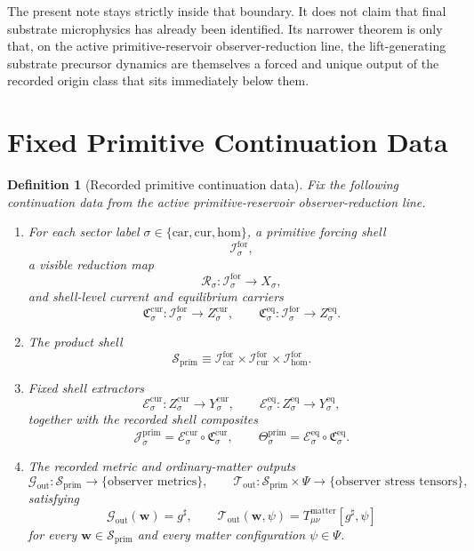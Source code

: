 \documentclass[11pt]{article}
\newcommand{\CompletedMetric}{g^{\sharp}}
\newcommand{\Car}{\mathrm{car}}
\newcommand{\Cur}{\mathrm{cur}}
\newcommand{\Hom}{\mathrm{hom}}
\newcommand{\ForSpace}[1]{\mathcal I_{#1}^{\mathrm{for}}}
\newcommand{\PrimShell}{\mathcal S_{\mathrm{prim}}}
\newcommand{\Reduction}[1]{\mathcal R_{#1}}
\newcommand{\CurrentCarrier}[1]{\mathfrak C_{#1}^{\mathrm{cur}}}
\newcommand{\EqCarrier}[1]{\mathfrak C_{#1}^{\mathrm{eq}}}
\newcommand{\CurrentExtract}[1]{\mathscr E_{#1}^{\mathrm{cur}}}
\newcommand{\EqExtract}[1]{\mathscr E_{#1}^{\mathrm{eq}}}
\newcommand{\PrimCurrent}[1]{\mathcal J_{#1}^{\mathrm{prim}}}
\newcommand{\PrimTheta}[1]{\Theta_{#1}^{\mathrm{prim}}}
\newcommand{\MetricOut}{\mathscr G_{\mathrm{out}}}
\newcommand{\MatterOut}{\mathscr T_{\mathrm{out}}}
\newtheorem{definition}{Definition}
\begin{document}
The present note stays strictly inside that boundary. It does not claim that final substrate microphysics has already been identified. Its narrower theorem is only that, on the active primitive-reservoir observer-reduction line, the lift-generating substrate precursor dynamics are themselves a forced and unique output of the recorded origin class that sits immediately below them.

\section{Fixed Primitive Continuation Data}

\begin{definition}[Recorded primitive continuation data]
\label{def:fixed}
Fix the following continuation data from the active primitive-reservoir observer-reduction line.
\begin{enumerate}
    \item For each sector label \(\sigma\in\{\Car,\Cur,\Hom\}\), a primitive forcing shell
    \[
    \ForSpace{\sigma},
    \]
    a visible reduction map
    \[
    \Reduction{\sigma}:\ForSpace{\sigma}\to X_{\sigma},
    \]
    and shell-level current and equilibrium carriers
    \[
    \CurrentCarrier{\sigma}:\ForSpace{\sigma}\to Z_{\sigma}^{\mathrm{cur}},
    \qquad
    \EqCarrier{\sigma}:\ForSpace{\sigma}\to Z_{\sigma}^{\mathrm{eq}}.
    \]
    \item The product shell
    \[
    \PrimShell
    \equiv
    \ForSpace{\Car}\times \ForSpace{\Cur}\times \ForSpace{\Hom}.
    \]
    \item Fixed shell extractors
    \[
    \CurrentExtract{\sigma}:Z_{\sigma}^{\mathrm{cur}}\to Y_{\sigma}^{\mathrm{cur}},
    \qquad
    \EqExtract{\sigma}:Z_{\sigma}^{\mathrm{eq}}\to Y_{\sigma}^{\mathrm{eq}},
    \]
    together with the recorded shell composites
    \begin{equation}
    \PrimCurrent{\sigma}
    =
    \CurrentExtract{\sigma}\circ \CurrentCarrier{\sigma},
    \qquad
    \PrimTheta{\sigma}
    =
    \EqExtract{\sigma}\circ \EqCarrier{\sigma}.
    \label{eq:primcomposites}
    \end{equation}
    \item The recorded metric and ordinary-matter outputs
    \[
    \MetricOut:\PrimShell\to\{\text{observer metrics}\},
    \qquad
    \MatterOut:\PrimShell\times\Psi\to\{\text{observer stress tensors}\},
    \]
    satisfying
    \begin{equation}
    \MetricOut(\mathbf w)=\CompletedMetric,
    \qquad
    \MatterOut(\mathbf w,\psi)
    =
    T_{\mu\nu}^{\mathrm{matter}}[\CompletedMetric,\psi]
    \label{eq:fixedoutputs}
    \end{equation}
    for every \(\mathbf w\in\PrimShell\) and every matter configuration \(\psi\in\Psi\).
\end{enumerate}
\end{definition}
\end{document}
